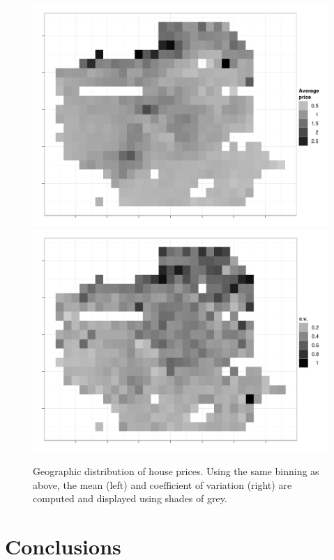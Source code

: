 \documentclass[oneside]{article}
\begin{document}
\begin{figure}[htbp]
  \centering
    \includegraphics[width=0.5\linewidth]{sf-bin-price}%
    \includegraphics[width=0.5\linewidth]{sf-bin-cv}
  \caption{Geographic distribution of house prices.  Using the same binning as above, the mean (left) and coefficient of variation (right) are computed and displayed using shades of grey.}
  \label{fig:sf-price}
\end{figure}


\section{Conclusions}
\end{document}

